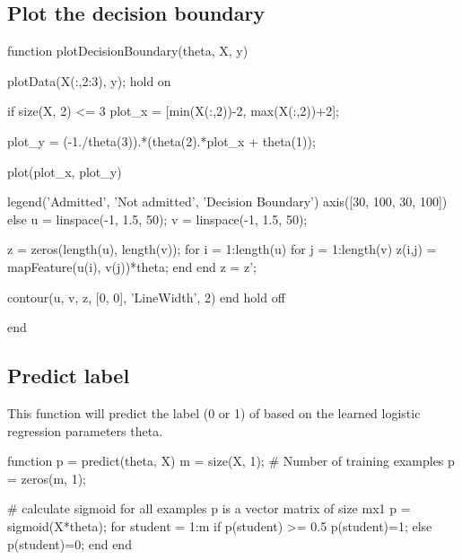 \documentclass[a4paper,12pt]{report}
\begin{document}
\subsection{Plot the decision boundary}
\begin{python}
function plotDecisionBoundary(theta, X, y)

plotData(X(:,2:3), y);
hold on

if size(X, 2) <= 3
    plot_x = [min(X(:,2))-2,  max(X(:,2))+2];

    plot_y = (-1./theta(3)).*(theta(2).*plot_x + theta(1));

    plot(plot_x, plot_y)
    
    legend('Admitted', 'Not admitted', 'Decision Boundary')
    axis([30, 100, 30, 100])
else
    u = linspace(-1, 1.5, 50);
    v = linspace(-1, 1.5, 50);

    z = zeros(length(u), length(v));
    for i = 1:length(u)
        for j = 1:length(v)
            z(i,j) = mapFeature(u(i), v(j))*theta;
        end
    end
    z = z'; %

    contour(u, v, z, [0, 0], 'LineWidth', 2)
end
hold off

end

\end{python}

\subsection{Predict label }
This function will predict the label (0 or 1) of based on the learned logistic regression parameters theta.
\begin{python}
function p = predict(theta, X)
m = size(X, 1); # Number of training examples
p = zeros(m, 1);

# calculate sigmoid for all examples p is a vector matrix of size mx1
p = sigmoid(X*theta); 
for student = 1:m
    if p(student) >= 0.5
        p(student)=1;
    else
        p(student)=0;
    end
end
\end{python}
\end{document}
